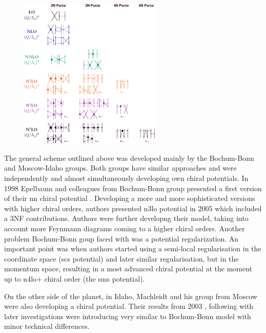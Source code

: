 \begin{figure}[h]
    \begin{center}
    \includegraphics[width=0.6\textwidth]{Figures/chiral.png}
    \end{center}
    \caption{}
    \label{proton_rad}
\end{figure}

The general scheme outlined above was developed mainly by the Bochum-Bonn and Moscow-Idaho groups.
Both groups have similar approaches and were independently and almost simultaneously
developing own chiral potentials. In 1998 Epelbaum and colleagues from Bochum-Bonn group 
presented a first version of their \gls{nn} chiral potential \cite{EPELBAOUM1998107, epelbaum2000two}.
Developing a more and more sophisticated versions with higher chiral orders, authors presented
\gls{n3lo} potential in 2005 \cite{epelbaum2005two} which included a 3NF contributions.
Authors were further developng their model, taking into account more Feynmann diagrams
coming to a higher chiral orders. Another problem Bochum-Bonn goup faced with was a potential regularization. An important point was when authors started using a semi-local regularisation 
in the coordinate space (\gls{scs} potential) \cite{Epelbaum2014SCS} and later similar regularisation, but in the momentum space, resulting in a most advanced chiral potential at the moment up to  
\gls{n4lo+} chiral order \cite{reinkrebs2018} (the \gls{sms} potential).

On the other side of the planet, in Idaho, Machleidt and his group from Moscow were also developing 
a chiral potential. Their results from 2003 \cite{Entem2003}, following with later investigations \cite{Machleidt2005, Machleidt2010, Entem2017} were introducing very similar to Bochum-Bonn
model with minor technical differences.

